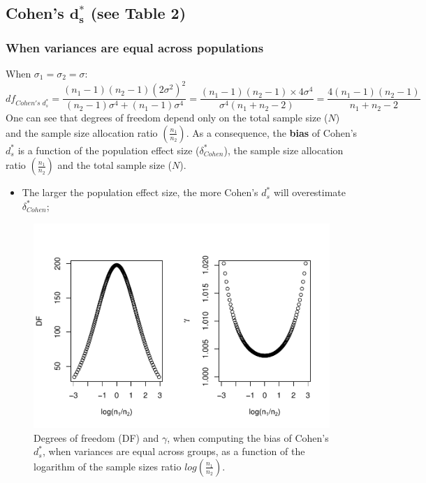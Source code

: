 \documentclass[
  english,
  man,mask]{apa6}
\providecommand{\tightlist}{%
  \setlength{\itemsep}{0pt}\setlength{\parskip}{0pt}}
\begin{document}
\hypertarget{cohens-bmd_s-see-table-2}{%
\subsection{\texorpdfstring{Cohen's \(\bm{d^*_s}\) (see Table 2)}{Cohen's \textbackslash bm\{d\^{}*\_s\} (see Table 2)}}\label{cohens-bmd_s-see-table-2}}

\hypertarget{when-variances-are-equal-across-populations}{%
\subsubsection{When variances are equal across populations}\label{when-variances-are-equal-across-populations}}

When \(\sigma_1=\sigma_2=\sigma\):
\[df_{Cohen's \; d^*_s} = \frac{(n_1-1)(n_2-1)(2\sigma^2)^2}{(n_2-1)\sigma^4+(n_1-1)\sigma^4} = \frac{(n_1-1)(n_2-1)\times 4\sigma^4}{\sigma^4(n_1+n_2-2)} = \frac{4(n_1-1)(n_2-1)}{n_1+n_2-2}\]
One can see that degrees of freedom depend only on the total sample size (\(N\)) and the sample size allocation ratio \(\left( \frac{n_1}{n_2}\right)\). As a consequence, the \textbf{bias} of Cohen's \(d^*_s\) is a function of the population effect size (\(\delta^*_{Cohen}\)), the sample size allocation ratio \(\left( \frac{n_1}{n_2}\right)\) and the total sample size (\(N\)).

\begin{itemize}
\tightlist
\item
  The larger the population effect size, the more Cohen's \(d^*_s\) will overestimate \(\delta^*_{Cohen}\);
\end{itemize}

\begin{figure}
\centering
\includegraphics{Theoretical-Bias-of-all-estimators-as-a-function-of-population-parameters_files/figure-latex/biascohendprimehomNratio2-1.pdf}
\caption{\label{fig:biascohendprimehomNratio2}Degrees of freedom (DF) and \(\gamma\), when computing the bias of Cohen's \(d^*_s\), when variances are equal across groups, as a function of the logarithm of the sample sizes ratio \(log\left(\frac{n_1}{n_2} \right)\).}
\end{figure}
\end{document}
